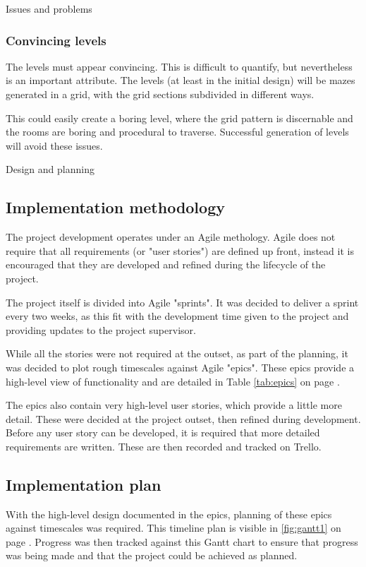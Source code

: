 \documentclass[progress]{cmpreport}
\begin{document}
\begin{section}{Issues and problems}
\subsubsection{Convincing levels}
The levels must appear convincing. This is difficult to quantify, but nevertheless is an important attribute. The levels (at least in the initial design) will be mazes generated in a grid, with the grid sections subdivided in different ways.

This could easily create a boring level, where the grid pattern is discernable and the rooms are boring and procedural to traverse. Successful generation of levels will avoid these issues.

\end{section}

\begin{section}{Design and planning}

\subsection{Implementation methodology}
The project development operates under an Agile methology. Agile does not require that all requirements (or "user stories") are defined up front, instead it is encouraged that they are developed and refined during the lifecycle of the project.

The project itself is divided into Agile "sprints". It was decided to deliver a sprint every two weeks, as this fit with the development time given to the project and providing updates to the project supervisor.

While all the stories were not required at the outset, as part of the planning, it was decided to plot rough timescales against Agile "epics". These epics provide a high-level view of functionality and are detailed in Table \ref{tab:epics} on page \pageref{tab:epics}.

The epics also contain very high-level user stories, which provide a little more detail. These were decided at the project outset, then refined during development. Before any user story can be developed, it is required that more detailed requirements are written. These are then recorded and tracked on Trello. 

\subsection{Implementation plan}

With the high-level design documented in the epics, planning of these epics against timescales was required. This timeline plan is visible in \ref{fig:gantt1} on page \pageref{fig:gantt1}. Progress was then tracked against this Gantt chart to ensure that progress was being made and that the project could be achieved as planned.


\end{section}
\end{document}

